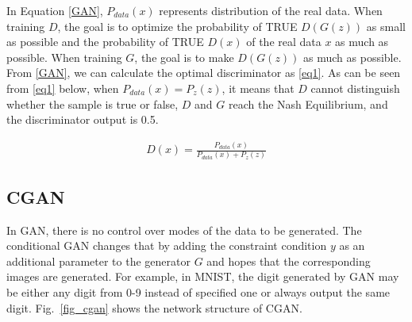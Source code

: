 \documentclass[conference]{IEEEtran}
\begin{document}
In Equation \eqref{GAN}, $P_{data}(x)$ represents distribution of the real data. When training $D$, the goal is to optimize the probability of TRUE $D(G(z))$ as small as possible and the probability of TRUE $D\left(x\right)$ of the real data $x$ as much as possible. When training $G$, the goal is to make $D(G(z))$ as much as possible. From \eqref{GAN}, we can calculate the optimal discriminator as \eqref{eq1}. As can be seen from \eqref{eq1} below, when $P_{data}\left(x\right)=P_z\left(z\right)$, it means that $D$ cannot distinguish whether the sample is true or false, $D$ and $G$ reach the Nash Equilibrium, and the discriminator output is 0.5.

\begin{equation}
\begin{split}
\label{eq1}
D(x)=\frac{P_{data}(x)}{P_{data}(x)+P_z(z)}
\end{split}
\end{equation}

\subsection{CGAN}
In GAN, there is no control over modes of the data to be generated. The conditional GAN changes that by adding the constraint condition $y$ as an additional parameter to the generator $G$ and hopes that the corresponding images are generated. For example, in MNIST, the digit generated by GAN may be either any digit from 0-9 instead of specified one or always output the same digit. Fig.~\ref{fig_cgan} shows the network structure of CGAN.


\end{document}
